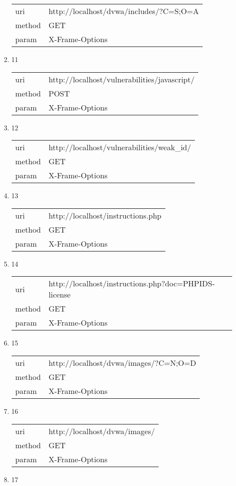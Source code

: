 \documentclass[10pt]{article}
\begin{document}
\begin{itemize}
\begin{enumerate}
\begin{tabular}{| l | p{12cm}}
uri & http://localhost/dvwa/includes/?C=S;O=A \\
method & GET \\
param & X-Frame-Options \\
\end{tabular}
\item[] 11
\begin{tabular}{| l | p{12cm}}
uri & http://localhost/vulnerabilities/javascript/ \\
method & POST \\
param & X-Frame-Options \\
\end{tabular}
\item[] 12
\begin{tabular}{| l | p{12cm}}
uri & http://localhost/vulnerabilities/weak\_id/ \\
method & GET \\
param & X-Frame-Options \\
\end{tabular}
\item[] 13
\begin{tabular}{| l | p{12cm}}
uri & http://localhost/instructions.php \\
method & GET \\
param & X-Frame-Options \\
\end{tabular}
\item[] 14
\begin{tabular}{| l | p{12cm}}
uri & http://localhost/instructions.php?doc=PHPIDS-license \\
method & GET \\
param & X-Frame-Options \\
\end{tabular}
\item[] 15
\begin{tabular}{| l | p{12cm}}
uri & http://localhost/dvwa/images/?C=N;O=D \\
method & GET \\
param & X-Frame-Options \\
\end{tabular}
\item[] 16
\begin{tabular}{| l | p{12cm}}
uri & http://localhost/dvwa/images/ \\
method & GET \\
param & X-Frame-Options \\
\end{tabular}
\item[] 17

\end{enumerate}
\end{itemize}
\end{document}
